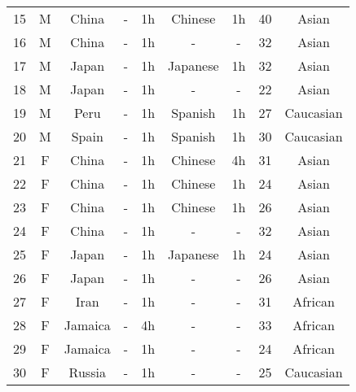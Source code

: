 \documentclass[runningheads]{llncs}
\begin{document}
\begin{table}
\begin{tabular}{ccccccccc}
15 & M   & China   & -         & 1h            & Chinese        & 1h             & 40  & Asian      \\
16 & M   & China   & -         & 1h            & -           & -             & 32  & Asian      \\
17 & M   & Japan  & -         & 1h            & Japanese    & 1h              & 32    & Asian            \\
18 & M   & Japan  & -         & 1h            & -               & -               & 22    & Asian           \\
19 & M   & Peru    & -          & 1h            & Spanish        & 1h              & 27  & Caucasian  \\
20 & M   & Spain   & -          & 1h             & Spanish        & 1h              & 30  & Caucasian  \\
21 & F & China   & -          & 1h           & Chinese        & 4h              & 31  & Asian      \\
22 & F & China   & -         & 1h            & Chinese        & 1h              & 24  & Asian      \\
23 & F & China   & -        & 1h            & Chinese        & 1h              & 26    & Asian      \\
24 & F & China   & -          & 1h            & -       &  -          & 32  & Asian      \\
25 & F & Japan   & -          & 1h            & Japanese           &  1h              & 24    & Asian      \\
26 & F & Japan   & -          & 1h            & -              &  -              & 26 & Asian      \\
27 & F & Iran    & -           & 1h            & -              & -               & 31     & African           \\
28 & F & Jamaica    & -           & 4h            & -              & -               & 33    &  African           \\
29 & F & Jamaica    & -            & 1h            & -              & -               & 24    & African           \\
30 & F & Russia    & -           & 1h             & -              & -               & 25    & Caucasian          
\end{tabular}
\end{table}
\end{document}
